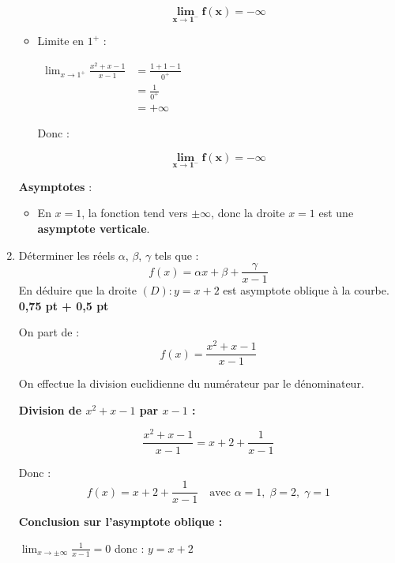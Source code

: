\documentclass[12pt,a4paper]{article}
\begin{document}
\begin{enumerate}
\begin{itemize}
					\begin{resultbox}
            \[
                \mathbf{\lim_{x \to 1^-} f(x) = -\infty }
            \]
					\end{resultbox}

    \item Limite en \( 1^+ \) :

    \(
			\begin{aligned}
				\lim_{x \to 1^+} \frac{x^2 + x - 1}{x - 1} &= \frac{1 + 1 - 1}{0^+}\\ 
																									 &= \frac{1}{0^+}\\ 
																									 &= +\infty
			\end{aligned}
		\)

    Donc :
    
					\begin{resultbox}
            \[
                \mathbf{\lim_{x \to 1^-} f(x) = -\infty }
            \]
					\end{resultbox}
    
\end{itemize}

\textbf{Asymptotes} :
\begin{itemize}
    \item En \( x = 1 \), la fonction tend vers \( \pm\infty \), donc la droite \( x = 1 \) est une \textbf{asymptote verticale}.
\end{itemize}

    
\item Déterminer les réels \( \alpha \), \( \beta \), \( \gamma \) tels que :
\[
f(x) = \alpha x + \beta + \frac{\gamma}{x - 1}
\]
En déduire que la droite \( (D) : y = x + 2 \) est asymptote oblique à la courbe. \hfill \textbf{0{,}75 pt + 0{,}5 pt}

On part de :
\[
f(x) = \frac{x^2 + x - 1}{x - 1}
\]

On effectue la division euclidienne du numérateur par le dénominateur.

\textbf{Division de \( x^2 + x - 1 \) par \( x - 1 \) :}

\[
\frac{x^2 + x - 1}{x - 1} = x + 2 + \frac{1}{x - 1}
\]

Donc :
\[
\boxed{f(x) = x + 2 + \frac{1}{x - 1}} \quad \text{avec } \alpha = 1,\; \beta = 2,\; \gamma = 1
\]

\textbf{Conclusion sur l’asymptote oblique :}

\( \lim_{x \to \pm\infty}\frac{1}{x - 1}=0 \) donc : $y = x + 2$


\end{enumerate}
\end{document}
